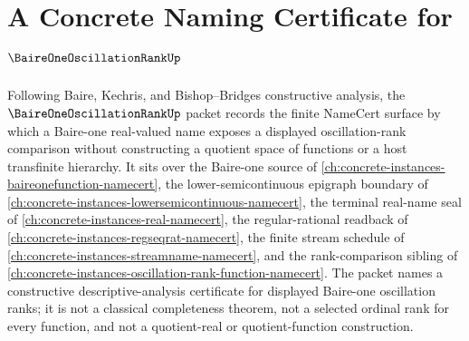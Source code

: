 \chapter{A Concrete Naming Certificate for $\BaireOneOscillationRankUp$}
\label{ch:concrete-instances-baire-one-oscillation-rank-namecert}

Following Baire, Kechris, and Bishop--Bridges constructive analysis, the $\BaireOneOscillationRankUp$ packet records the finite NameCert surface by which a Baire-one real-valued name exposes a displayed oscillation-rank comparison without constructing a quotient space of functions or a host transfinite hierarchy. It sits over the Baire-one source of \autoref{ch:concrete-instances-baireonefunction-namecert}, the lower-semicontinuous epigraph boundary of \autoref{ch:concrete-instances-lowersemicontinuous-namecert}, the terminal real-name seal of \autoref{ch:concrete-instances-real-namecert}, the regular-rational readback of \autoref{ch:concrete-instances-regseqrat-namecert}, the finite stream schedule of \autoref{ch:concrete-instances-streamname-namecert}, and the rank-comparison sibling of \autoref{ch:concrete-instances-oscillation-rank-function-namecert}. The packet names a constructive descriptive-analysis certificate for displayed Baire-one oscillation ranks; it is not a classical completeness theorem, not a selected ordinal rank for every function, and not a quotient-real or quotient-function construction.

